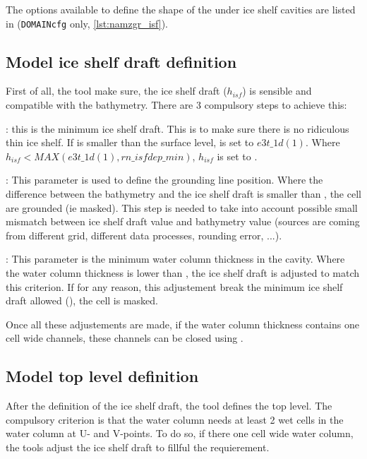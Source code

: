 \documentclass[../main/NEMO_manual]{subfiles}
\begin{document}
   The options available to define the shape of the under ice shelf cavities are listed in  (\texttt{DOMAINcfg} only, \autoref{lst:namzgr_isf}).

\subsection{Model ice shelf draft definition}
\label{subsec:zgrisf_isfd}

First of all, the tool make sure, the ice shelf draft ($h_{isf}$) is sensible and compatible with the bathymetry.
There are 3 compulsory steps to achieve this:

\begin{description}
\item{:} this is the minimum ice shelf draft. This is to make sure there is no ridiculous thin ice shelf. If  is smaller than the surface level,  is set to $e3t\_1d(1)$. 
  Where $h_{isf} < MAX(e3t\_1d(1),rn\_isfdep\_min)$, $h_{isf}$ is set to .

\item{:} This parameter is used to define the grounding line position.
  Where the difference between the bathymetry and the ice shelf draft is smaller than , the cell are grounded (ie masked). 
  This step is needed to take into account possible small mismatch between ice shelf draft value and bathymetry value (sources are coming from different grid, different data processes, rounding error, ...).

\item{:} This parameter is the minimum water column thickness in the cavity. 
  Where the water column thickness is lower than , the ice shelf draft is adjusted to match this criterion. 
  If for any reason, this adjustement break the minimum ice shelf draft allowed (), the cell is masked.
\end{description}

Once all these adjustements are made, if the water column thickness contains one cell wide channels, these channels can be closed using .  
 
\subsection{Model top level definition}
After the definition of the ice shelf draft, the tool defines the top level. 
The compulsory criterion is that the water column needs at least 2 wet cells in the water column at U- and V-points.
To do so, if there one cell wide water column, the tools adjust the ice shelf draft to fillful the requierement.\\
\end{document}
